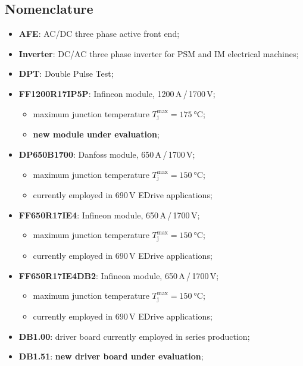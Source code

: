 \documentclass[12pt,a4paper,oneside]{book}
\begin{document}
	\subsection*{Nomenclature}
	\begin{itemize}
		\item[--] \textbf{AFE}: AC/DC three phase active front end;
		\item[--] \textbf{Inverter}: DC/AC three phase inverter for PSM and IM electrical machines;
		\item[--] \textbf{DPT}: Double Pulse Test;
		\item[--] \textbf{FF1200R17IP5P}: Infineon module, 1200\,A\,/\,1700\,V;
		\begin{itemize}
			\item[--] maximum junction temperature $T_\text{j}^\text{max} = \SI{175}{\celsius}$;
			\item[--] \textbf{new module under evaluation};
		\end{itemize}
		\item[--] \textbf{DP650B1700}: Danfoss module, 650\,A\,/\,1700\,V;
		\begin{itemize}
			\item[--] maximum junction temperature $T_\text{j}^\text{max} = \SI{150}{\celsius}$;
			\item[--] currently employed in 690\,V EDrive applications;
		\end{itemize}
		\item[--] \textbf{FF650R17IE4}: Infineon module, 650\,A\,/\,1700\,V;
		\begin{itemize}
			\item[--] maximum junction temperature $T_\text{j}^\text{max} = \SI{150}{\celsius}$;
			\item[--] currently employed in 690\,V EDrive applications;
		\end{itemize}
		\item[--] \textbf{FF650R17IE4DB2}: Infineon module, 650\,A\,/\,1700\,V;
		\begin{itemize}
			\item[--] maximum junction temperature $T_\text{j}^\text{max} = \SI{150}{\celsius}$;
			\item[--] currently employed in 690\,V EDrive applications;
		\end{itemize}
		\item[--] \textbf{DB1.00}: driver board currently employed in series production;
		\item[--] \textbf{DB1.51}: \textbf{new driver board under evaluation};

\end{itemize}
\end{document}
